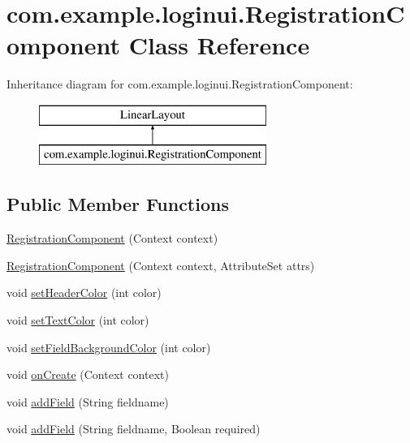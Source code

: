 \hypertarget{classcom_1_1example_1_1loginui_1_1_registration_component}{\section{com.\+example.\+loginui.\+Registration\+Component Class Reference}
\label{classcom_1_1example_1_1loginui_1_1_registration_component}
}
Inheritance diagram for com.\+example.\+loginui.\+Registration\+Component\+:\begin{figure}[H]
\begin{center}
\leavevmode
\includegraphics[height=2.000000cm]{classcom_1_1example_1_1loginui_1_1_registration_component}
\end{center}
\end{figure}
\subsection*{Public Member Functions}
\begin{DoxyCompactItemize}
\item 
\hyperlink{classcom_1_1example_1_1loginui_1_1_registration_component_a41281e46f8f4f3ab43362a73150b33dd}{Registration\+Component} (Context context)
\item 
\hyperlink{classcom_1_1example_1_1loginui_1_1_registration_component_ac8b35f033ff3377bc24452941a2755fd}{Registration\+Component} (Context context, Attribute\+Set attrs)
\item 
void \hyperlink{classcom_1_1example_1_1loginui_1_1_registration_component_a2cf46eb87d908d2a41116ae768aa4a7c}{set\+Header\+Color} (int color)
\item 
void \hyperlink{classcom_1_1example_1_1loginui_1_1_registration_component_a59f6917d7327378eacbf8694ee407687}{set\+Text\+Color} (int color)
\item 
void \hyperlink{classcom_1_1example_1_1loginui_1_1_registration_component_af7bb62c95c652c4928c4038ce8343e5d}{set\+Field\+Background\+Color} (int color)
\item 
void \hyperlink{classcom_1_1example_1_1loginui_1_1_registration_component_a0eef8c76a87323d299a10b3f8828986b}{on\+Create} (Context context)
\item 
void \hyperlink{classcom_1_1example_1_1loginui_1_1_registration_component_a51cfbb68ec30e0266047661aee3e26b3}{add\+Field} (String fieldname)
\item 
void \hyperlink{classcom_1_1example_1_1loginui_1_1_registration_component_a03275021d51f8085a7a706730ac41f81}{add\+Field} (String fieldname, Boolean required)
\end{DoxyCompactItemize}


